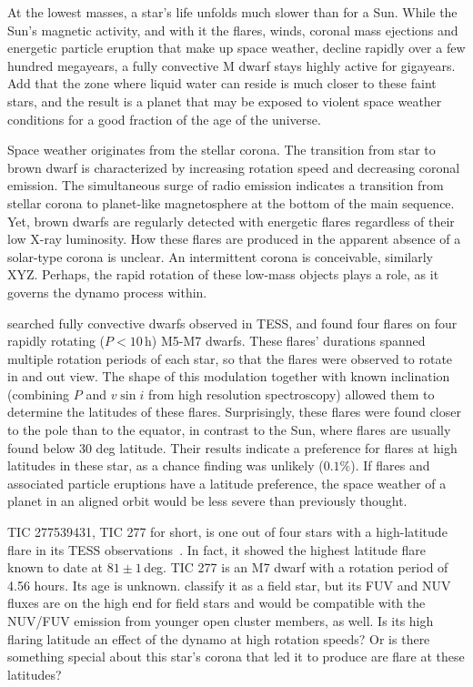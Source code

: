 \documentclass[twocolumn]{aastex631}
\begin{document}
At the lowest masses, a star's life unfolds much slower than for a Sun. While the Sun's magnetic activity, and with it the flares, winds, coronal mass ejections and energetic particle eruption that make up space weather, decline rapidly over a few hundred megayears, a fully convective M dwarf stays highly active for gigayears. Add that the zone where liquid water can reside is much closer to these faint stars, and the result is a planet that may be exposed to violent space weather conditions for a good fraction of the age of the universe. 

Space weather originates from the stellar corona. The transition from star to brown dwarf is characterized by increasing rotation speed and decreasing coronal emission. The simultaneous surge of radio emission indicates a transition from stellar corona to planet-like magnetosphere at the bottom of the main sequence. Yet, brown dwarfs are regularly detected with energetic flares regardless of their low X-ray luminosity. How these flares are produced in the apparent absence of a solar-type corona is unclear. An intermittent corona is conceivable, similarly XYZ. Perhaps, the rapid rotation of these low-mass objects plays a role, as it governs the dynamo process within.  

\citet{ilin2021giant} searched fully convective dwarfs observed in TESS, and found four flares on four rapidly rotating ($P<10\,$h) M5-M7 dwarfs. These flares' durations spanned multiple rotation periods of each star, so that the flares were observed to rotate in and out view. The shape of this modulation together with known inclination (combining $P$ and $v \sin i$ from high resolution spectroscopy) allowed them to determine the latitudes of these flares. Surprisingly, these flares were found closer to the pole than to the equator, in contrast to the Sun, where flares are usually found below 30 deg latitude. Their results indicate a preference for flares at high latitudes in these star, as a chance finding was unlikely ($0.1\%$). If flares and associated particle eruptions have a latitude preference, the space weather of a planet in an aligned orbit would be less severe than previously thought. %


TIC 277539431, TIC 277 for short, is one out of four stars with a high-latitude flare in its TESS observations~\citep{ilin2021giant}. In fact, it showed the highest latitude flare known to date at $81\pm1\,$deg. TIC 277 is an M7 dwarf with a rotation period of 4.56 hours. Its age is unknown. \citet{schneider2018hazmat} classify it as a field star, but its FUV and NUV fluxes are on the high end for field stars and would be compatible with the NUV/FUV emission from younger open cluster members, as well. 
Is its high flaring latitude an effect of the dynamo at high rotation speeds? Or is there something special about this star's corona that led it to produce are flare at these latitudes? 
\end{document}
